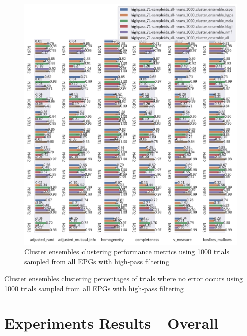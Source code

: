 \begin{theappendices}
\begin{figure}[htbp]
\centering
\includegraphics[width=\textwidth]{./figures/clust_comparison/highpass_71-sampleids_all-nruns_1000_cluster_ensembles.pdf}
\caption{Cluster ensembles clustering performance metrics using 1000 trials sampled from all EPGs with high-pass filtering}
\label{appendix:fig:highpass_71-sampleids_all-nruns_1000_cluster_ensembles}
\end{figure}

\begin{table}[htbp]
\centering
{}
\caption{Cluster ensembles clustering percentages of trials where no error occurs using 1000 trials sampled from all EPGs with high-pass filtering}
\label{appendix:table:highpass_71-sampleids_all-nruns_1000_cluster_ensembles}
\end{table}

\section{Experiments Results---Overall}


\end{theappendices}
